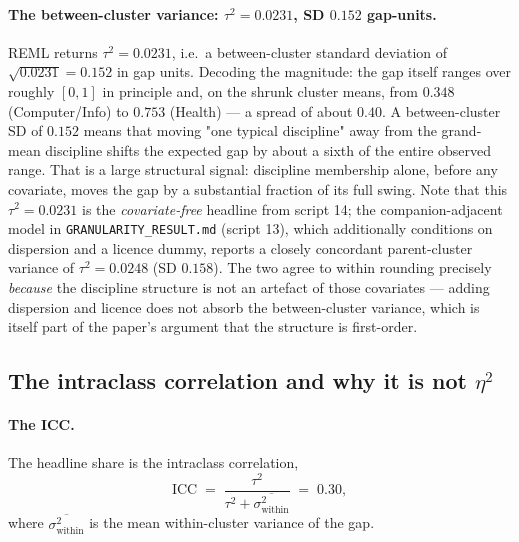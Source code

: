 \documentclass[11pt]{article}
\begin{document}
\paragraph{The between-cluster variance: $\tau^2 = 0.0231$, SD $0.152$ gap-units.} REML returns $\tau^2=0.0231$, i.e.\ a between-cluster standard deviation of $\sqrt{0.0231}=0.152$ in gap units. Decoding the magnitude: the gap itself ranges over roughly $[0,1]$ in principle and, on the shrunk cluster means, from $0.348$ (Computer/Info) to $0.753$ (Health) --- a spread of about $0.40$. A between-cluster SD of $0.152$ means that moving "one typical discipline" away from the grand-mean discipline shifts the expected gap by about a sixth of the entire observed range. That is a large structural signal: discipline membership alone, before any covariate, moves the gap by a substantial fraction of its full swing. Note that this $\tau^2=0.0231$ is the \emph{covariate-free} headline from script 14; the companion-adjacent model in \texttt{GRANULARITY\_RESULT.md} (script 13), which additionally conditions on dispersion and a licence dummy, reports a closely concordant parent-cluster variance of $\tau^2=0.0248$ (SD $0.158$). The two agree to within rounding precisely \emph{because} the discipline structure is not an artefact of those covariates --- adding dispersion and licence does not absorb the between-cluster variance, which is itself part of the paper's argument that the structure is first-order.

\subsection{The intraclass correlation and why it is not $\eta^2$}

\paragraph{The ICC.} The headline share is the intraclass correlation,
\[
\mathrm{ICC} \;=\; \frac{\tau^2}{\tau^2 + \overline{\sigma^2_{\text{within}}}} \;=\; 0.30,
\]
where $\overline{\sigma^2_{\text{within}}}$ is the mean within-cluster variance of the gap.
\end{document}
